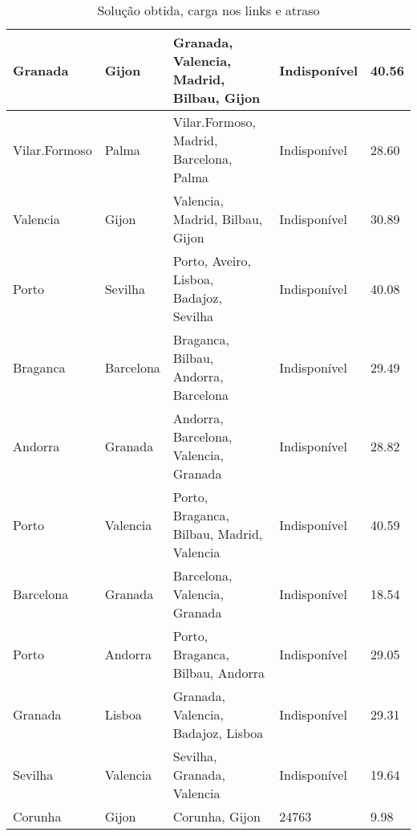 \begin{table}[!htb]
{\begin{tabular}{|l|l|l|l|l|}
Granada & Gijon & Granada, Valencia, Madrid, Bilbau, Gijon & Indisponível & 40.56 \\ \hline
Vilar.Formoso & Palma & Vilar.Formoso, Madrid, Barcelona, Palma & Indisponível & 28.60 \\ \hline
Valencia & Gijon & Valencia, Madrid, Bilbau, Gijon & Indisponível & 30.89 \\ \hline
Porto & Sevilha & Porto, Aveiro, Lisboa, Badajoz, Sevilha & Indisponível & 40.08 \\ \hline
Braganca & Barcelona & Braganca, Bilbau, Andorra, Barcelona & Indisponível & 29.49 \\ \hline
Andorra & Granada & Andorra, Barcelona, Valencia, Granada & Indisponível & 28.82 \\ \hline
Porto & Valencia & Porto, Braganca, Bilbau, Madrid, Valencia & Indisponível & 40.59 \\ \hline
Barcelona & Granada & Barcelona, Valencia, Granada & Indisponível & 18.54 \\ \hline
Porto & Andorra & Porto, Braganca, Bilbau, Andorra & Indisponível & 29.05 \\ \hline
Granada & Lisboa & Granada, Valencia, Badajoz, Lisboa & Indisponível & 29.31 \\ \hline
Sevilha & Valencia & Sevilha, Granada, Valencia & Indisponível & 19.64 \\ \hline
Corunha & Gijon & Corunha, Gijon & 24763 & 9.98 \\ \hline
\end{tabular}}
\caption[]{Solução obtida, carga nos links e atraso}
\end{table}

\begin{table}[!htb]
        \centering
\caption[]{Solução obtida, carga nos links e atraso}
\end{table}

